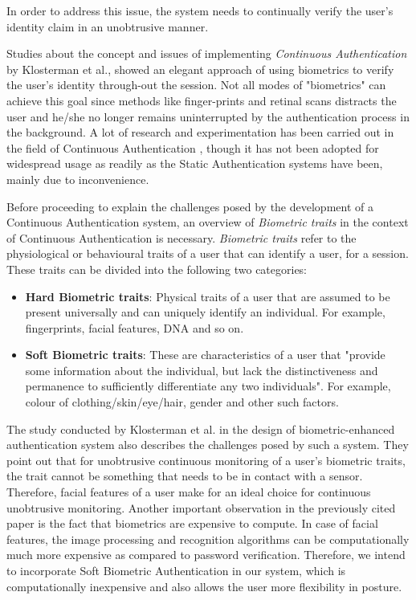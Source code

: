 \documentclass[12pt]{report}			%
\begin{document}
In order to address this issue, the system needs to continually verify the user's identity claim in an unobtrusive manner.

Studies about the concept and issues of implementing \emph{Continuous Authentication} by Klosterman et al.\cite{Klos00}, showed an elegant approach of using biometrics to verify the user's identity through-out the session. Not all modes of "biometrics" can achieve this goal since methods like finger-prints and retinal scans distracts the user and he/she no longer remains uninterrupted by the authentication process in the background.
A lot of research and experimentation has been carried out in the field of Continuous Authentication \cite{Niin10,Klos00,mon00,turk03,sim07,azz08,azz082}, though it has not been adopted for widespread usage as readily as the Static Authentication systems have been, mainly due to inconvenience.

Before proceeding to explain the challenges posed by the development of a Continuous Authentication system, an overview of \emph{Biometric traits} in the context of Continuous Authentication is necessary.
\emph{Biometric traits} refer to the physiological or behavioural traits of a user that can identify a user, for a session.
These traits can be divided into the following two categories:
\begin{itemize}
	\item {\bf Hard Biometric traits}: Physical traits of a user that are assumed to be present universally and can uniquely identify an individual. For example, fingerprints, facial features, DNA and so on.
	\item {\bf Soft Biometric traits}: These are characteristics of a user that "provide some information about the individual, but lack the distinctiveness and permanence to sufficiently differentiate any two individuals"\cite{Jain204}. For example, colour of clothing/skin/eye/hair, gender and other such factors.
\end{itemize}

The study conducted by Klosterman et al.\cite{Klos00} in the design of biometric-enhanced authentication system also describes the challenges posed by such a system.
They point out that for unobtrusive continuous monitoring of a user's biometric traits, the trait cannot be something that needs to be in contact with a sensor.
Therefore, facial features of a user make for an ideal choice for continuous unobtrusive monitoring.
Another important observation in the previously cited paper is the fact that biometrics are expensive to compute.
In case of facial features, the image processing and recognition algorithms can be computationally much more expensive as compared to password verification.
Therefore, we intend to incorporate Soft Biometric Authentication in our system, which is computationally inexpensive and also allows the user more flexibility in posture. 
\end{document}
